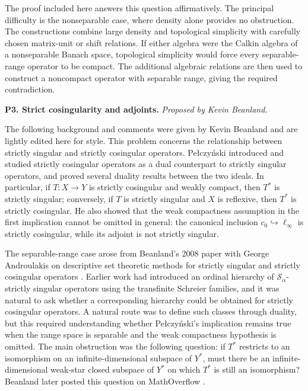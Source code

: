 \documentclass[11pt,reqno]{amsart}
\theoremstyle{plain}
\theoremstyle{definition}
\begin{document}
The proof included here answers this question affirmatively. The principal difficulty is the nonseparable case, where density alone provides no obstruction. The constructions combine large density and topological simplicity with carefully chosen matrix-unit or shift relations. If either algebra were the Calkin algebra of a nonseparable Banach space, topological simplicity would force every separable-range operator to be compact. The additional algebraic relations are then used to construct a noncompact operator with separable range, giving the required contradiction.

\medskip

\noindent\textbf{P3. Strict cosingularity and adjoints.} \emph{Proposed by Kevin Beanland.} 

The following background and comments were given by Kevin Beanland and are lightly edited here for style. This problem concerns the relationship between strictly singular and strictly cosingular operators. Pe{\l}czy\'nski introduced and studied strictly cosingular operators as a dual counterpart to strictly singular operators, and proved several duality results between the two ideals. In particular, if $T \colon X\to Y$ is strictly cosingular and weakly compact, then $T^*$ is strictly singular; conversely, if $T$ is strictly singular and $X$ is reflexive, then $T^*$ is strictly cosingular. He also showed that the weak compactness assumption in the first implication cannot be omitted in general: the canonical inclusion $c_0\hookrightarrow \ell_\infty$ is strictly cosingular, while its adjoint is not strictly singular.

The separable-range case arose from Beanland's 2008 paper with George Androulakis on descriptive set theoretic methods for strictly singular and strictly cosingular operators \cite{AndroulakisBeanland2008}. Earlier work had introduced an ordinal hierarchy of $\mathcal S_\alpha$-strictly singular operators using the transfinite Schreier families, and it was natural to ask whether a corresponding hierarchy could be obtained for strictly cosingular operators. A natural route was to define such classes through duality, but this required understanding whether Pe{\l}czy\'nski's implication remains true when the range space is separable and the weak compactness hypothesis is omitted. The main obstruction was the following question: if $T^*$ restricts to an isomorphism on an infinite-dimensional subspace of $Y^*$, must there be an infinite-dimensional weak-star closed subspace of $Y^*$ on which $T^*$ is still an isomorphism? Beanland later posted this question on MathOverflow \cite{BeanlandMO98449}.
\end{document}

